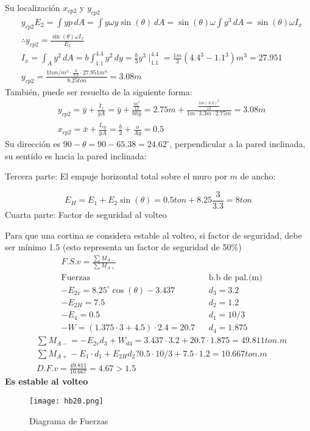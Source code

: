 Su localización $x_{cp2}$ y $y_{cp2}$
\begin{align*}
    &y_{cp2}E_2=\int yp\,dA=\int y\omega y\sin{(\theta)}\,dA=\sin{(\theta)}\omega\int y^3\, dA=\sin{(\theta)}\omega I_x\\
    &\therefore y_{cp2}=\frac{\sin{(\theta)}\omega I_x}{E_2}\\
    &I_x=\int_A y^2\, dA=b\int_{1.1}^{4.4}y^2\, dy=\frac{b}{3}y^3\mid_{1.1}^{4.4}=\frac{1m}{3}\left(4.4^3-1.1^3\right)m^3=27.951\\
    &y_{cp2}=\frac{1ton/m^3\cdot \frac{3}{3.3}\cdot 27.951m^4}{8.25ton}=3.08m
\end{align*}
También, puede ser resuelto de la siguiente forma:
\begin{align*}
    &y_{cp2}=\bar{y}+\frac{\bar{I}_x}{\bar{y}A}=\bar{y}+\frac{\frac{bh^3}{12}}{bh\bar{y}}=2.75m+\frac{\frac{1m(3.3)^3}{12}}{1m\cdot 3.3m\cdot 2.75m}=3.08m\\
    &x_{cp2}=\bar{x}+\frac{\bar{I}_{xy}}{\bar{y}A}=\frac{b}{2}+\frac{o}{A\bar{y}}=0.5
\end{align*}
Su dirección es $90-\theta=90-65.38=24.62^{\circ}$, perpendicular a la pared inclinada, su sentido es hacia la pared inclinada:

Tercera parte: El empuje horizontal total sobre el muro por $m$ de ancho: 

\begin{equation*}
    E_H=E_1+E_2\sin{(\theta)}=0.5ton+8.25\frac{3}{3.3}=8ton
\end{equation*}
Cuarta parte: Factor de seguridad al volteo

Para que una cortina se considera estable al volteo, si factor de seguridad, debe ser mínimo 1.5 (esto representa un factor de seguridad de 50\%)
\begin{align*}
    &F.S.v=\frac{\sum M_{A-}}{\sum M_{A+}}\\
    &\text{Fuerzas}&&\text{b.b de pal.(m)}\\
    &-E_{2v}=8.25^{\circ}\cos{(\theta)}-3.437&&d_3=3.2\\
    &-E_{2H}=7.5&&d_2=1.2\\ 
    &-E_4=0.5&&d_1=10/3\\
    &-W=(1.375\cdot 3+4.5)\cdot 2.4=20.7&&d_4=1.875
\end{align*}
\begin{align*}
    &\sum M_{A-}=-E_{2v}d_3+W_{d4}=3.437\cdot 3.2+20.7\cdot 1.875=49.811ton. m\\
    &\sum M_{A+}-E_1\cdot d_1+E_{2H}d_2?0.5\cdot 10/3+7.5\cdot 1.2=10.667ton.m\\
    &D.F.v=\frac{49.811}{10.667}=4.67>1.5
\end{align*}
\textbf{Es estable al volteo}
\begin{figure}[h!]
\centering
  \texttt{[image: hb20.png]}
  \caption{Diagrama de Fuerzas}
  \label{hb20}
\end{figure}

